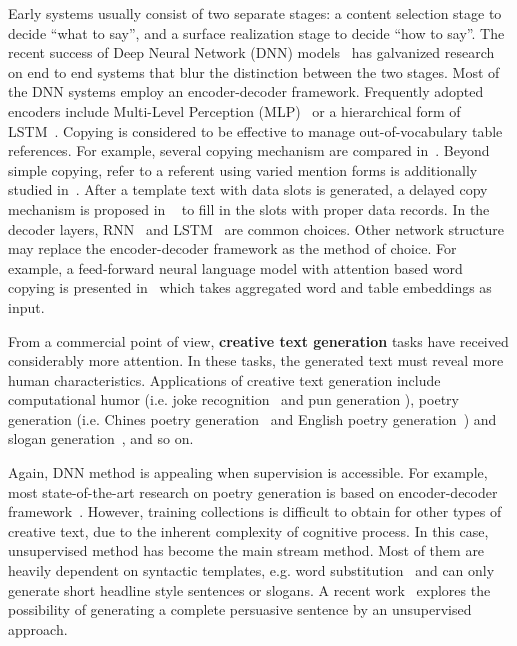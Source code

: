 \documentclass[sigconf]{acmart}
\begin{document}
Early systems usually consist of two separate stages: a content selection stage to decide ``what to say'', and a  surface realization stage to decide ``how to say''.  The recent success of Deep Neural Network (DNN) models~\cite{Sutskever2011Generating} has galvanized research on end to end systems that blur the distinction between the two stages. Most of the DNN systems employ an encoder-decoder framework. Frequently adopted encoders include Multi-Level Perception (MLP)~\cite{dong2017learning,Wiseman2017Challenges,Bao2019Text} or a hierarchical form of LSTM~\cite{Yang2017Reference}. Copying is considered to be effective to manage out-of-vocabulary table references. For example,  
several copying mechanism are compared in~\cite{Bao2019Text, Wiseman2017Challenges}. Beyond simple copying, refer to a referent using varied mention forms is additionally studied in~\cite{Yang2017Reference}. After a template text with data slots is generated,  a delayed copy mechanism is proposed in ~\cite{Li2018Point} to fill in the slots with proper data records.   In the decoder layers, RNN~\cite{Wiseman2017Challenges} and LSTM~\cite{Yang2017Reference} are common choices. 
Other network structure may replace the encoder-decoder framework as the method of choice. For example, a feed-forward neural language model with attention based word copying is presented in~\cite{Lebret2016Neural} which takes aggregated word and table embeddings as input. 

From a commercial point of view, \textbf{creative text generation} tasks have received considerably more attention. In these tasks, the generated text must reveal more human characteristics. 
Applications of creative text generation include computational humor (i.e. joke recognition~\cite{kiddon2011double} and pun generation \cite{valitutti2013let}), poetry generation (i.e. Chines poetry generation~\cite{wang2016chinese,Zhang2014Chinese} and English poetry generation~\cite{Ghazvininejad2016Generating})
and slogan generation~\cite{tomavsic2014implementation}, and so on.

Again, DNN method is appealing when supervision is accessible. For example, most state-of-the-art research on poetry generation is based on encoder-decoder framework~\cite{Ghazvininejad2016Generating,wang2016chinese,Zhang2014Chinese}.
However, training collections is difficult to obtain for other types of creative text, due to the inherent complexity of cognitive process. 
In this case, unsupervised method has become the main stream method.
Most of them are heavily dependent on syntactic templates, e.g. word substitution~\cite{valitutti2013let,ozbal2013brainsup,Thomaidou2013Automated} and can only generate short headline style sentences or slogans. 
A recent work~\cite{munigala2018persuaide} explores the possibility of generating a complete persuasive sentence by an unsupervised approach.
\end{document}
